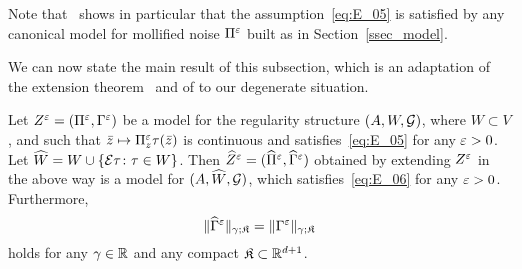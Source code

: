 \documentclass[reqno,11pt]{article}
\def\fraK{\mathfrak{K}}
\def\Zhat{\widehat Z}
\def\Gammahat{\widehat\Gamma}
\def\Pihat{\widehat\Pi}
\begin{document}
Note that~\cite[Prop.~8.27]{Hairer2014} shows in particular that the
assumption~\eqref{eq:E_05} is satisfied by any canonical model for mollified
noise $\Pi^\varepsilon$ built as in Section~\ref{ssec_model}. 

We can now state the main result of this subsection, which is an adaptation of
the extension theorem~\cite[Thm.~5.14]{Hairer2014} and of
\cite[Prop.~8.27]{Hairer2014} to our degenerate situation. 

\begin{prop}
\label{prop_extension_E} 
Let $Z^\varepsilon=(\Pi^\varepsilon,\Gamma^\varepsilon)$ be a model for the regularity structure
$(A,W,{\mathcal G})$, where $W\subset V$, and such that $\bar z\mapsto\Pi^\varepsilon_z\tau(\bar
z)$ is continuous and satisfies~\eqref{eq:E_05} for any $\varepsilon>0$. Let $\widehat
W=W\cup\{{\mathcal E}\tau\colon \tau\in W\}$. Then $\Zhat^\eps =
(\Pihat^\eps,\Gammahat^\eps)$ obtained by extending $Z^\varepsilon$ in the above way is
a model for $(A,\widehat W,{\mathcal G})$, which satisfies~\eqref{eq:E_06} for any
$\varepsilon>0$. Furthermore, 
\begin{equation}
 \label{eq:E_08}
 \norm{\Gammahat^\eps}_{\gamma;\fraK} = \norm{\Gamma^\eps}_{\gamma;\fraK}
\end{equation} 
holds for any $\gamma\in\mathbb{R}$ and any compact $\fraK\subset\R^{d+1}$. 
\end{prop}
%
\end{document}
